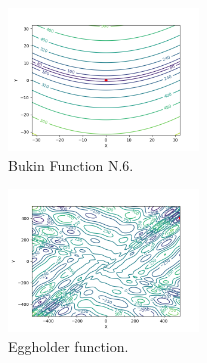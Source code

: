 \documentclass[a4paper,12pt]{article}
\begin{document}
\begin{figure}[h!]
    \centering
    \includegraphics[width=0.45\textwidth]{images/bukin_function_n6_contour.png}
    \caption{Bukin Function N.6.}
    \label{fig:bukin}
\end{figure}

\begin{figure}[h!]
    \centering
    \includegraphics[width=0.45\textwidth]{images/eggholder_function_contour.png}
    \caption{Eggholder function.}
    \label{fig:eggholder}
\end{figure}
\end{document}
